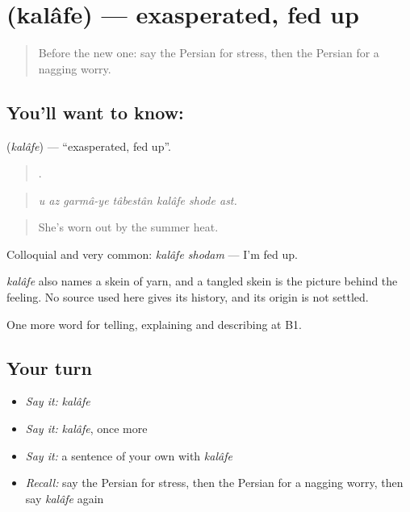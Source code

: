 \section[\texorpdfstring{\fa{کلافه} (kalâfe)}{کلافه (kalâfe)}]{ (kalâfe) — exasperated, fed up}

\label{lesson:FA-C485-kalafe}



\begin{quote}
Before the new one: say the Persian for stress, then the Persian for a nagging worry.
\end{quote}

\subsection*{You'll want to know: }
\textbf{} (\emph{kalâfe}) — \textquotedblleft{}exasperated, fed up\textquotedblright{}.

\begin{quote}
      .
\end{quote}

\begin{quote}
\emph{u az garmâ-ye tâbestân kalâfe shode ast.}
\end{quote}

\begin{quote}
She's worn out by the summer heat.
\end{quote}

Colloquial and very common: \emph{kalâfe shodam} — I'm fed up.

\begin{cousinweb}
\emph{kalâfe} also names a skein of yarn, and a tangled skein is the picture behind the feeling. No source used here gives its history, and its origin is not settled.
\end{cousinweb}

\begin{grammarlens}[title={What you've built}]
One more word for telling, explaining and describing at B1.
\end{grammarlens}

\subsection*{Your turn}
\begin{itemize}
\raggedright
  \item \emph{Say it:} \emph{kalâfe}
  \item \emph{Say it:} \emph{kalâfe}, once more
  \item \emph{Say it:} a sentence of your own with \emph{kalâfe}
  \item \emph{Recall:} say the Persian for stress, then the Persian for a nagging worry, then say \emph{kalâfe} again
\end{itemize}

